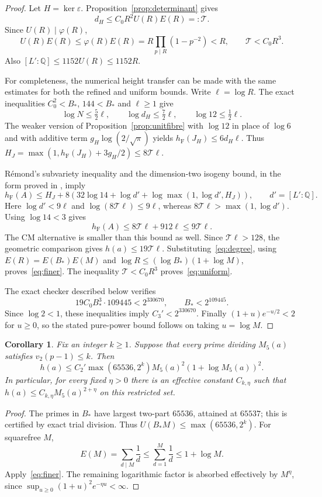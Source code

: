 \documentclass[11pt,a4paper]{article}
\newtheorem{corollary}[theorem]{Corollary}
\theoremstyle{definition}\newtheorem{remark}[theorem]{Remark}
\newcommand{\Q}{\mathbb Q}\newcommand{\Z}{\mathbb Z}
\newcommand{\hF}{h_{\mathrm F}}
\begin{document}
\begin{proof}
Let $H=\ker\varepsilon$. Proposition~\ref{prop:determinant} gives
\begin{equation}\label{eq:degree}
 d_H\le C_0R^2U(R)E(R)=:\mathcal T.
\end{equation}
Since $U(R)\mid\varphi(R)$,
\[
 U(R)E(R)\le\varphi(R)E(R)
        =R\prod_{p\mid R}(1-p^{-2})<R,
 \qquad \mathcal T<C_0R^3.
\]
Also $[L':\Q]\le1152U(R)\le1152R$.

For completeness, the numerical height transfer can be made with
the same estimates for both the refined and uniform bounds.
Write $\ell=\log R$. The exact inequalities $C_0^2<B_*$,
$144<B_*$ and $\ell\ge1$ give
\[
 \log N\le\tfrac52\ell,\qquad
 \log d_H\le\tfrac72\ell,\qquad
 \log12\le\tfrac12\ell.
\]
The weaker version of Proposition~\ref{prop:unitfibre} with
$\log12$ in place of $\log6$ and with additive term
$g_H\log(2/\sqrt\pi)$ yields
$\hF(J_H)\le6d_H\ell$.
Thus $H_J=\max(1,\hF(J_H)+3g_H/2)\le8\mathcal T\ell$.

R\'emond's subvariety inequality and the dimension-two isogeny
bound, in the form proved in \cite[Lemma~5.1]{Evaluation}, imply
\[
 \hF(A)\le H_J+8\left(32\log14+\log d'
           +\log\max(1,\log d',H_J)\right),\qquad d'=[L':\Q].
\]
Here $\log d'<9\ell$ and
$\log(8\mathcal T\ell)\le9\ell$, whereas
$8\mathcal T\ell>\max(1,\log d')$.
Using $\log14<3$ gives
\[
 \hF(A)\le8\mathcal T\ell+912\ell\le9\mathcal T\ell.
\]
The CM alternative is smaller than this bound as well.
Since $\mathcal T\ell>128$, the geometric comparison gives
$h(a)\le19\mathcal T\ell$. Substituting~\eqref{eq:degree}, using
$E(R)=E(B_*)E(M)$ and
$\log R\le(\log B_*)(1+\log M)$, proves~\eqref{eq:finer}.
The inequality $\mathcal T<C_0R^3$ proves~\eqref{eq:uniform}.

The exact checker described below verifies
\[
 19C_0B_*^3\cdot109445<2^{330670},\qquad B_*<2^{109445}.
\]
Since $\log2<1$, these inequalities imply $C_3'<2^{330670}$.
Finally $(1+u)e^{-u/2}<2$ for $u\ge0$, so the stated pure-power
bound follows on taking $u=\log M$.
\end{proof}

\begin{corollary}\label{cor:restricted}
Fix an integer $k\ge1$. Suppose that every prime dividing $M_5(a)$
satisfies $v_2(p-1)\le k$. Then
\[
 h(a)\le C_2'\max(65536,2^k)
                  M_5(a)^2(1+\log M_5(a))^2.
\]
In particular, for every fixed $\eta>0$ there is an effective constant
$C_{k,\eta}$ such that $h(a)\le C_{k,\eta}M_5(a)^{2+\eta}$
on this restricted set.
\end{corollary}
\begin{proof}
The primes in $B_*$ have largest two-part $65536$, attained at $65537$;
this is certified by exact trial division. Thus
$U(B_*M)\le\max(65536,2^k)$.
For squarefree $M$,
\[
 E(M)=\sum_{d\mid M}\frac1d\le\sum_{d=1}^{M}\frac1d
                                      \le1+\log M.
\]
Apply~\eqref{eq:finer}. The remaining logarithmic factor is absorbed
effectively by $M^\eta$, since
$\sup_{u\ge0}(1+u)^2e^{-\eta u}<\infty$.
\end{proof}
\end{document}
